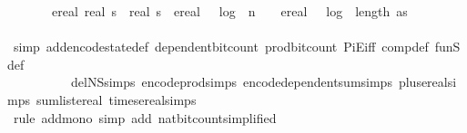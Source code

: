 \begin{isabellebody}
\ \ \ \ \ \ \ {\isacharparenleft}{\kern0pt}ereal\ {\isacharparenleft}{\kern0pt}real\ s\ {\isacharasterisk}{\kern0pt}\ real\ s\ {\isacharasterisk}{\kern0pt}\ {\isacharparenleft}{\kern0pt}{\isacharparenleft}{\kern0pt}ereal\ {\isacharparenleft}{\kern0pt}{}\ {\isacharasterisk}{\kern0pt}\ log\ {}\ {\isacharparenleft}{\kern0pt}{\isacharparenleft}{\kern0pt}n{\isacharminus}{\kern0pt}{}{\isacharparenright}{\kern0pt}{\isacharplus}{\kern0pt}{}{\isacharparenright}{\kern0pt}\ {\isacharplus}{\kern0pt}\ {}{\isacharparenright}{\kern0pt}\ {\isacharplus}{\kern0pt}\ ereal\ {\isacharparenleft}{\kern0pt}{}\ {\isacharasterisk}{\kern0pt}\ log\ {}\ {\isacharparenleft}{\kern0pt}{\isacharparenleft}{\kern0pt}length\ as{\isacharminus}{\kern0pt}{}{\isacharparenright}{\kern0pt}{\isacharplus}{\kern0pt}{}{\isacharparenright}{\kern0pt}\ {\isacharplus}{\kern0pt}\ {}{\isacharparenright}{\kern0pt}{\isacharparenright}{\kern0pt}\ {\isacharplus}{\kern0pt}\ {}{\isacharparenright}{\kern0pt}{\isacharparenright}{\kern0pt}{\isacharplus}{\kern0pt}\ {}{\isacharparenright}{\kern0pt}{\isacharparenright}{\kern0pt}{\isacharparenright}{\kern0pt}{\isacharparenright}{\kern0pt}{\isachardoublequoteclose}\isanewline
\ \ \ \ \ \ \isamarkupfalse%
\ {\isacharparenleft}{\kern0pt}simp\ add{\isacharcolon}{\kern0pt}encode{\isacharunderscore}{\kern0pt}state{\isacharunderscore}{\kern0pt}def\ dependent{\isacharunderscore}{\kern0pt}bit{\isacharunderscore}{\kern0pt}count\ prod{\isacharunderscore}{\kern0pt}bit{\isacharunderscore}{\kern0pt}count\ PiE{\isacharunderscore}{\kern0pt}iff\ comp{\isacharunderscore}{\kern0pt}def\ fun\isactrlsub S{\isacharunderscore}{\kern0pt}def\isanewline
\ \ \ \ \ \ \ \ \ \ del{\isacharcolon}{\kern0pt}N\isactrlsub S{\isachardot}{\kern0pt}simps\ encode{\isacharunderscore}{\kern0pt}prod{\isachardot}{\kern0pt}simps\ encode{\isacharunderscore}{\kern0pt}dependent{\isacharunderscore}{\kern0pt}sum{\isachardot}{\kern0pt}simps\ plus{\isacharunderscore}{\kern0pt}ereal{\isachardot}{\kern0pt}simps\ sum{\isacharunderscore}{\kern0pt}list{\isacharunderscore}{\kern0pt}ereal\ times{\isacharunderscore}{\kern0pt}ereal{\isachardot}{\kern0pt}simps{\isacharparenright}{\kern0pt}\isanewline
\ \ \ \ \ \ \isamarkupfalse%
\ {\isacharparenleft}{\kern0pt}rule\ add{\isacharunderscore}{\kern0pt}mono{\isacharcomma}{\kern0pt}\ simp\ add{\isacharcolon}{\kern0pt}\ nat{\isacharunderscore}{\kern0pt}bit{\isacharunderscore}{\kern0pt}count{\isacharbrackleft}{\kern0pt}simplified{\isacharbrackright}{\kern0pt}{\isacharparenright}{\kern0pt}\isanewline

\end{isabellebody}
